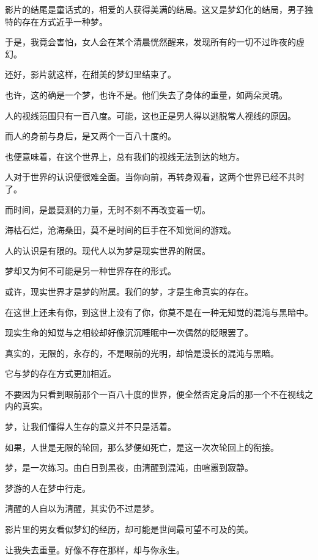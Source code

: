 		影片的结尾是童话式的，相爱的人获得美满的结局。这又是梦幻化的结局，男子独特的存在方式近乎一种梦。\par
		于是，我竟会害怕，女人会在某个清晨恍然醒来，发现所有的一切不过昨夜的虚幻。\par
		还好，影片就这样，在甜美的梦幻里结束了。\par
		也许，这的确是一个梦，也许不是。他们失去了身体的重量，如两朵灵魂。\par
		人的视线范围只有一百八度。可能，这也正是男人得以逃脱常人视线的原因。\par
		而人的身前与身后，是又两个一百八十度的。\par
		也便意味着，在这个世界上，总有我们的视线无法到达的地方。\par
		人对于世界的认识便很难全面。当你向前，再转身观看，这两个世界已经不共时了。\par
		而时间，是最莫测的力量，无时不刻不再改变着一切。\par
		海枯石烂，沧海桑田，莫不是时间的巨手在不知觉间的游戏。\par
		人的认识是有限的。现代人以为梦是现实世界的附属。\par
		梦却又为何不可能是另一种世界存在的形式。\par
		或许，现实世界才是梦的附属。我们的梦，才是生命真实的存在。\par
		在这世上还未有你，到这世上没有了你，你莫不是在一种无知觉的混沌与黑暗中。\par
		现实生命的知觉与之相较却好像沉沉睡眠中一次偶然的眨眼罢了。\par
		真实的，无限的，永存的，不是眼前的光明，却恰是漫长的混沌与黑暗。\par
		它与梦的存在方式更加相近。\par
		不要因为只看到眼前那个一百八十度的世界，便全然否定身后的那一个不在视线之内的真实。\par
		梦，让我们懂得人生存的意义并不只是活着。\par
		如果，人世是无限的轮回，那么梦便如死亡，是这一次次轮回上的衔接。\par
		梦，是一次练习。由白日到黑夜，由清醒到混沌，由喧嚣到寂静。\par
		梦游的人在梦中行走。\par
		清醒的人自以为清醒，其实仍不过是梦。\par
		影片里的男女看似梦幻的经历，却可能是世间最可望不可及的美。



		让我失去重量。好像不存在那样，却与你永生。

